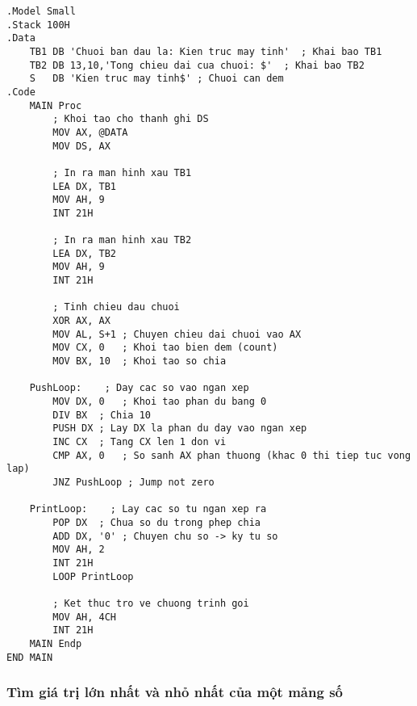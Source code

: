 \documentclass{article}
\begin{document}
\begin{lstlisting}[caption={Đếm chiều dài của một chuỗi ký tự cho trước}]
.Model Small
.Stack 100H
.Data
    TB1 DB 'Chuoi ban dau la: Kien truc may tinh'  ; Khai bao TB1
    TB2 DB 13,10,'Tong chieu dai cua chuoi: $'  ; Khai bao TB2
    S   DB 'Kien truc may tinh$' ; Chuoi can dem
.Code
    MAIN Proc
        ; Khoi tao cho thanh ghi DS
        MOV AX, @DATA
        MOV DS, AX
        
        ; In ra man hinh xau TB1
        LEA DX, TB1
        MOV AH, 9  
        INT 21H
        
        ; In ra man hinh xau TB2
        LEA DX, TB2
        MOV AH, 9
        INT 21H
        
        ; Tinh chieu dau chuoi
        XOR AX, AX
        MOV AL, S+1 ; Chuyen chieu dai chuoi vao AX 
        MOV CX, 0   ; Khoi tao bien dem (count)
        MOV BX, 10  ; Khoi tao so chia
        
    PushLoop:    ; Day cac so vao ngan xep
        MOV DX, 0   ; Khoi tao phan du bang 0
        DIV BX  ; Chia 10
        PUSH DX ; Lay DX la phan du day vao ngan xep
        INC CX  ; Tang CX len 1 don vi
        CMP AX, 0   ; So sanh AX phan thuong (khac 0 thi tiep tuc vong lap)
        JNZ PushLoop ; Jump not zero  
        
    PrintLoop:    ; Lay cac so tu ngan xep ra
        POP DX  ; Chua so du trong phep chia  
        ADD DX, '0' ; Chuyen chu so -> ky tu so
        MOV AH, 2
        INT 21H
        LOOP PrintLoop
        
        ; Ket thuc tro ve chuong trinh goi
        MOV AH, 4CH
        INT 21H
    MAIN Endp
END MAIN
\end{lstlisting}
\newpage

\subsubsection{Tìm giá trị lớn nhất và nhỏ nhất của một mảng số}
\end{document}
